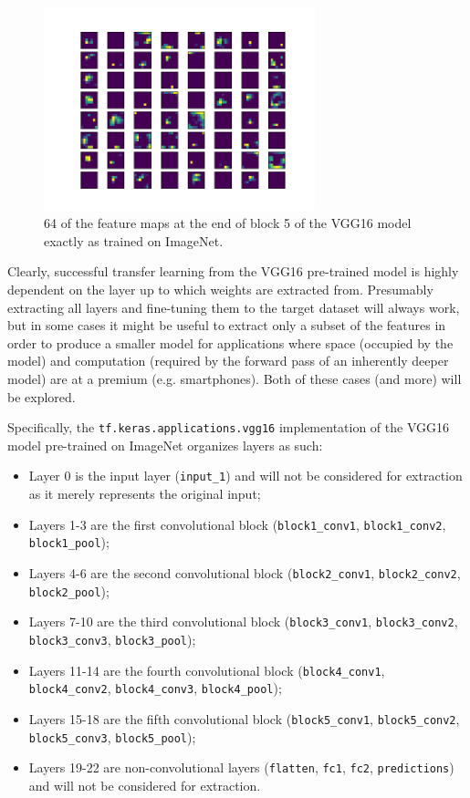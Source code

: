 \begin{figure}[ht]
    \centering
    \includegraphics[width=0.7\textwidth]{figs/vgg16_block5.png}
    \caption{64 of the feature maps at the end of block 5 of the VGG16 model exactly as trained on ImageNet.}
    \label{fig:vgg16_block5}
\end{figure}

Clearly, successful transfer learning from the VGG16 pre-trained model is highly dependent on the layer up to which weights are extracted from. Presumably extracting all layers and fine-tuning them to the target dataset will always work, but in some cases it might be useful to extract only a subset of the features in order to produce a smaller model for applications where space (occupied by the model) and computation (required by the forward pass of an inherently deeper model) are at a premium (e.g. smartphones). Both of these cases (and more) will be explored.

Specifically, the \verb|tf.keras.applications.vgg16| implementation of the VGG16 model pre-trained on ImageNet organizes layers as such:

\begin{itemize}
    \item Layer 0 is the input layer (\verb|input_1|) and will not be considered for extraction as it merely represents the original input;
    \item Layers 1-3 are the first convolutional block (\verb|block1_conv1|, \verb|block1_conv2|, \verb|block1_pool|);
    \item Layers 4-6 are the second convolutional block (\verb|block2_conv1|, \verb|block2_conv2|, \verb|block2_pool|);
    \item Layers 7-10 are the third convolutional block (\verb|block3_conv1|, \verb|block3_conv2|, \verb|block3_conv3|, \verb|block3_pool|);
    \item Layers 11-14 are the fourth convolutional block (\verb|block4_conv1|, \verb|block4_conv2|, \verb|block4_conv3|, \verb|block4_pool|);
    \item Layers 15-18 are the fifth convolutional block (\verb|block5_conv1|, \verb|block5_conv2|, \verb|block5_conv3|, \verb|block5_pool|);
    \item Layers 19-22 are non-convolutional layers (\verb|flatten|, \verb|fc1|, \verb|fc2|, \verb|predictions|) and will not be considered for extraction.
\end{itemize}

